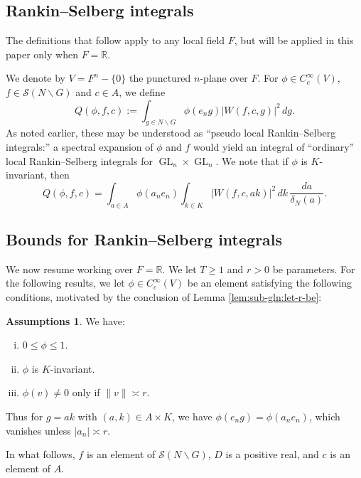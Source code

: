 \documentclass[reqno]{amsart}
\DeclareMathOperator{\GL}{GL}
\theoremstyle{plain} \newtheorem{theorem} {Theorem}
\theoremstyle{definition} \newtheorem{definition} [theorem] {Definition}
\newtheorem{assumptions} [theorem] {Assumptions}
\theoremstyle{itplain} %
\numberwithin{equation}{section}
\numberwithin{theorem}{section}
\renewcommand{\geq}{\geqslant}
\renewcommand{\leq}{\leqslant}
\begin{document}
\subsection{Rankin--Selberg integrals}\label{sec:rank-selb-integr}
The definitions that follow apply to any local field $F$, but will be applied in this paper only when $F = \mathbb{R}$.

We denote by $V = F^{n} - \{0\}$ the punctured $n$-plane over $F$.  For $\phi \in C_c^\infty(V)$, $f \in \mathcal{S}(N \backslash G)$ and $c \in A$, we define
\begin{equation*}
  Q(\phi,f,c) := \int _{g \in N \backslash G}
  \phi(e_n g) |W(f,c,g)|^2 \, d g.
\end{equation*}
As noted earlier, these may be understood as ``pseudo local Rankin--Selberg integrals:'' a spectral expansion of $\phi$ and $f$ would yield an integral of ``ordinary'' local Rankin--Selberg integrals for $\GL_n \times \GL_n$.  We note that if $\phi$ is $K$-invariant, then
\begin{equation*}
  Q(\phi,f,c) =
  \int _{a \in A}
  \phi(a_n e_n) 
  \int _{k \in K}
  |W(f,c,a k)|^2 \, d k \, \frac{d a}{\delta_N(a)}.
\end{equation*}

\subsection{Bounds for Rankin--Selberg integrals}\label{sec:bounds-at-real-1}
We now resume working over $F = \mathbb{R}$.  We let $T \geq 1$ and $r > 0$ be parameters.  For the following results, we let $\phi \in C_c^\infty(V)$ be an element satisfying the following conditions, motivated by the conclusion of Lemma \ref{lem:sub-gln:let-r-be}:
\begin{assumptions}\label{sec:bounds-at-real-assumptions-phi}
  We have:
\begin{enumerate}[(i)]
\item $0 \leq \phi \leq 1$.
\item $\phi$ is $K$-invariant.
\item $\phi(v) \neq 0$ only if $\|v\| \asymp r$.
\end{enumerate}
\end{assumptions}
Thus for $g = a k$ with $(a,k) \in A \times K$, we have $\phi(e_n g) = \phi(a_n e_n)$, which vanishes unless $|a_n| \asymp r$.

In what follows, $f$ is an element of $\mathcal{S}(N \backslash G)$, $D$ is a positive real, and $c$ is an element of $A$.
\end{document}
